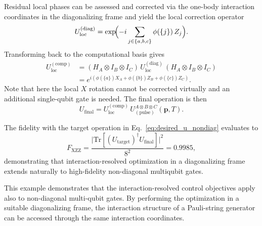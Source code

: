 \medskip
\noindent
Residual local phases can be assessed and corrected via the one-body interaction coordinates in the diagonalizing frame and yield the local correction operator
\begin{equation}
U_{\mathrm{loc}}^{(\mathrm{diag})}
=
\exp\!\Bigl(-i\sum_{j\in\{a,b,c\}}\phi(\{j\})\, Z_j\Bigr).
\end{equation}
Transforming back to the computational basis gives
\begin{equation}
\begin{aligned}
U_{\mathrm{loc}}^{(\mathrm{comp})}
&=
(H_A\!\otimes\!I_B\!\otimes\!I_C)\,
U_{\mathrm{loc}}^{(\mathrm{diag})}\,
(H_A\!\otimes\!I_B\!\otimes\!I_C) \\
&=
e^{i(\phi(\{a\}) X_A + \phi(\{b\}) Z_B + \phi(\{c\}) Z_C)} .
\end{aligned}
\end{equation}
Note that here the local $X$ rotation cannot be corrected virtually and an additional single-qubit gate is needed. The final operation is then
\begin{equation}
U_{\mathrm{final}}
=
U_{\mathrm{loc}}^{(\mathrm{comp})}\,U^{A\otimes B\otimes C}_{(\mathrm{pulse})}(\mathbf p,T).
\end{equation}

\medskip
\noindent
The fidelity with the target operation in Eq.~\eqref{eq:desired_u_nondiag} evaluates to
\begin{equation}
F_{\mathrm{XZZ}}
=
\frac{\big|\mathrm{Tr}\!\left[
\left(U_{\mathrm{target}}\right)^{\!\dagger}
U_{\mathrm{final}}
\right]\big|^{2}}{8^{2}}
= 0.9985,
\end{equation}
demonstrating that interaction-resolved optimization in a diagonalizing frame extends naturally to high-fidelity non-diagonal multiqubit gates.

\medskip
\noindent
This example demonstrates that the interaction-resolved control objectives apply also to non-diagonal multi-qubit gates. By performing the optimization in a suitable diagonalizing frame, the interaction structure of a Pauli-string generator can be accessed through the same interaction coordinates. 

